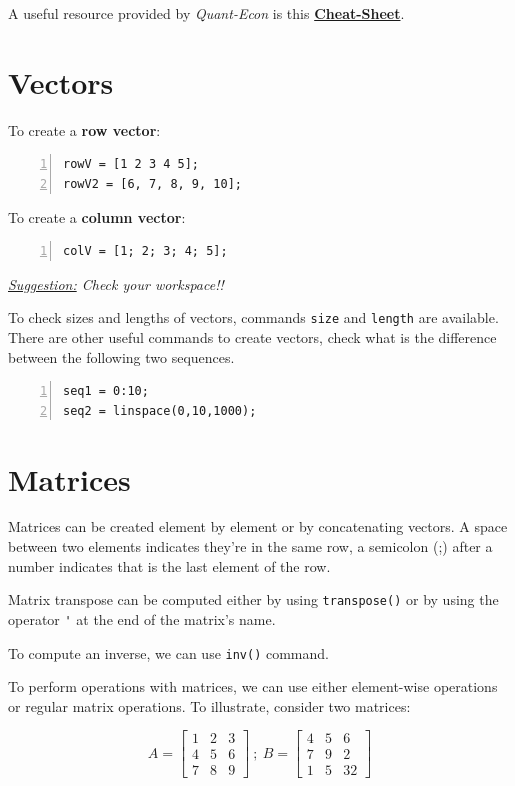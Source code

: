 \documentclass[a4paper,11pt]{article}
\begin{document}
A useful resource provided by \textit{Quant-Econ} is this \href{https://cheatsheets.quantecon.org/}{{\textbf{Cheat-Sheet}}}.

\section{Vectors}

To create a \textbf{row vector}:

\begin{Verbatim}[numbers=left]
rowV = [1 2 3 4 5];
rowV2 = [6, 7, 8, 9, 10];
\end{Verbatim}

To create a \textbf{column vector}:

\begin{Verbatim}[numbers=left]
colV = [1; 2; 3; 4; 5];
\end{Verbatim}

\textit{\underline{Suggestion:} Check your workspace!!}

To check sizes and lengths of vectors, commands \verb+size+ and \verb+length+ are available. There are other useful commands to create vectors, check what is the difference between the following two sequences.

\begin{Verbatim}[numbers = left]
seq1 = 0:10;
seq2 = linspace(0,10,1000);
\end{Verbatim}

\section{Matrices}

Matrices can be created element by element or by concatenating vectors. A space between two elements indicates they're in the same row, a semicolon (;) after a number indicates that is the last element of the row.

Matrix transpose can be computed either by using \verb+transpose()+ or by using the operator \verb+'+ at the end of the matrix's name.

To compute an inverse, we can use \verb+inv()+ command.

To perform operations with matrices, we can use either element-wise operations or regular matrix operations. To illustrate, consider two matrices:

\[
A = \begin{bmatrix}
1 & 2 & 3 \\
4 & 5 & 6 \\
7 & 8 & 9 
\end{bmatrix} \ ; \ 
B = \begin{bmatrix}
4 & 5 & 6 \\
7 & 9 & 2 \\
1 & 5 & 32
\end{bmatrix}
\]
\end{document}
